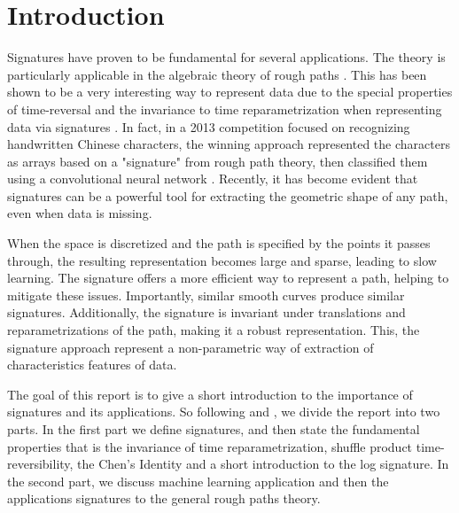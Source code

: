 \section{Introduction}\label{sec:introduction}


Signatures have proven to be fundamental for several applications. The theory is particularly applicable in the algebraic theory of rough paths \cite{geng2021introduction, geng2017reconstruction, fermanian2023new}. This has been shown to be a very interesting way to represent data due to the special properties of time-reversal and the invariance to time reparametrization when representing data via signatures \cite{chevyrev2016primer}. In fact, in a 2013 competition focused on recognizing handwritten Chinese characters, the winning approach represented the characters as arrays based on a "signature" from rough path theory, then classified them using a convolutional neural network \cite{yin2013icdar}. Recently, it has become evident that signatures can be a powerful tool for extracting the geometric shape of any path, even when data is missing.

When the space is discretized and the path is specified by the points it passes through, the resulting representation becomes large and sparse, leading to slow learning. The signature offers a more efficient way to represent a path, helping to mitigate these issues. Importantly, similar smooth curves produce similar signatures. Additionally, the signature is invariant under translations and reparametrizations of the path, making it a robust representation. This, the signature approach represent a non-parametric way of extraction of characteristics features of data.


The goal of this report is to give a short introduction to the importance of signatures and its applications. So following \cite{geng2021introduction} and \cite{chevyrev2016primer}, we divide the report into two parts. In the first part we define
signatures, and then state the fundamental properties that is the invariance of time reparametrization, shuffle product time-reversibility, the Chen's Identity and a short introduction to the log signature. In the second part, we discuss machine
learning application and then the applications signatures to the general rough paths theory.
